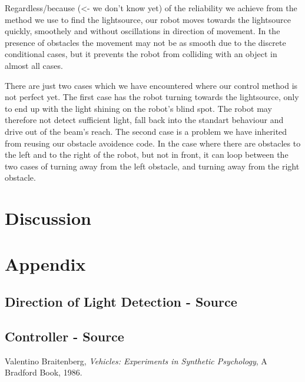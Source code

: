 \documentclass[paper=a4, fontsize=12pt]{scrartcl}	%
\numberwithin{equation}{section}		%
\numberwithin{figure}{section}			%
\numberwithin{table}{section}				%
\begin{document}
Regardless/because (<- we don't know yet) of the reliability we achieve from the method we use to find the lightsource, our robot moves towards the lightsource quickly, smoothely and without oscillations in direction of movement. In the presence of obstacles the movement may not be as smooth due to the discrete conditional cases, but it prevents the robot from colliding with an object in almost all cases.

There are just two cases which we have encountered where our control method is not perfect yet. The first case has the robot turning towards the lightsource, only to end up with the light shining on the robot's blind spot. The robot may therefore not detect sufficient light, fall back into the standart behaviour and drive out of the beam's reach. The second case is a problem we have inherited from reusing our obstacle avoidence code. In the case where there are obstacles to the left and to the right of the robot, but not in front, it can loop between the two cases of turning away from the left obstacle, and turning away from the right obstacle.
\section{Discussion}


\section{Appendix}
\subsection{Direction of Light Detection - Source}

\subsection{Controller - Source}

\begin{thebibliography}{9}
  Valentino Braitenberg,
  \emph{Vehicles: Experiments in Synthetic Psychology},
  A Bradford Book,
  1986.
\end{thebibliography}

\end{document}
